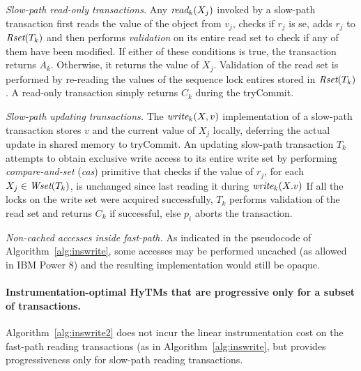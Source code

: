 \vspace{1mm}\noindent\textit{Slow-path read-only transactions.}
Any $\textit{read}_k(X_j)$ invoked by a slow-path transaction first reads the value of the object from $v_j$, 
checks if $r_j$ is se, adds $r_j$ to $\textit{Rset}(T_k)$
and then performs \emph{validation} on its entire read set to check if any of them have been modified. 
If either of these conditions is true,
the transaction returns $A_k$. Otherwise, it returns the value of $X_j$. 
Validation of the read set is performed by re-reading the values of the sequence lock entires stored in $\textit{Rset}(T_k)$.
A read-only transaction simply returns $C_k$ during the tryCommit.

\vspace{1mm}\noindent\textit{Slow-path updating transactions.}
The $\textit{write}_k(X,v)$ implementation of a slow-path transaction stores
$v$ and the current value of $X_j$ locally, 
deferring the actual update in shared memory to tryCommit. 
An updating slow-path transaction $T_k$ attempts to obtain exclusive write access to its 
entire write set by performing \emph{compare-and-set} (\emph{cas})
primitive that checks if the value of $r_j$, for each $X_j\in \textit{Wset}(T_k)$, is unchanged since last reading it during $\textit{write}_k(X.v)$
If all the locks on the write set were acquired successfully, $T_k$ performs validation of the read set and returns $C_k$ if successful, else $p_i$ aborts the transaction.

\vspace{1mm}\noindent\textit{Non-cached accesses inside fast-path.}
As indicated in the pseudocode of Algorithm~\ref{alg:inswrite}, some accesses may be performed uncached (as allowed
in IBM Power 8) and the resulting implementation would still be opaque. 
%

\paragraph{Instrumentation-optimal HyTMs that are progressive only for a subset of transactions.}
Algorithm~\ref{alg:inswrite2} does not incur the linear instrumentation cost
on the fast-path reading transactions (as in Algorithm~\ref{alg:inswrite}, but provides progressiveness only
for slow-path reading transactions.
%

%
